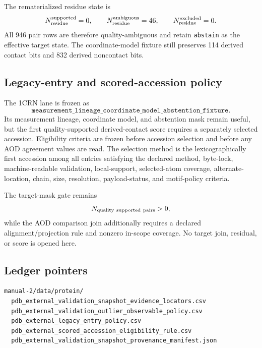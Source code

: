 The rematerialized residue state is
\[
N_{\rm residue}^{\rm supported}=0,
\qquad
N_{\rm residue}^{\rm ambiguous}=46,
\qquad
N_{\rm residue}^{\rm excluded}=0.
\]
All 946 pair rows are therefore quality-ambiguous and retain
\texttt{abstain} as the effective target state.  The coordinate-model fixture
still preserves 114 derived contact bits and 832 derived noncontact bits.

\subsection{Legacy-entry and scored-accession policy}

The 1CRN lane is frozen as
\[
\texttt{measurement\_lineage\_coordinate\_model\_abstention\_fixture}.
\]
Its measurement lineage, coordinate model, and abstention mask remain useful,
but the first quality-supported derived-contact score requires a separately
selected accession.  Eligibility criteria are frozen before accession selection
and before any AOD agreement values are read.  The selection method is the
lexicographically first accession among all entries satisfying the declared
method, byte-lock, machine-readable validation, local-support, selected-atom
coverage, alternate-location, chain, size, resolution, payload-status, and
motif-policy criteria.

The target-mask gate remains
\[
N_{\rm quality\ supported\ pairs}>0,
\]
while the AOD comparison join additionally requires a declared
alignment/projection rule and nonzero in-scope coverage.  No target join,
residual, or score is opened here.

\subsection{Ledger pointers}

\begin{verbatim}
manual-2/data/protein/
  pdb_external_validation_snapshot_evidence_locators.csv
  pdb_external_validation_outlier_observable_policy.csv
  pdb_external_legacy_entry_policy.csv
  pdb_external_scored_accession_eligibility_rule.csv
  pdb_external_validation_snapshot_provenance_manifest.json
\end{verbatim}
